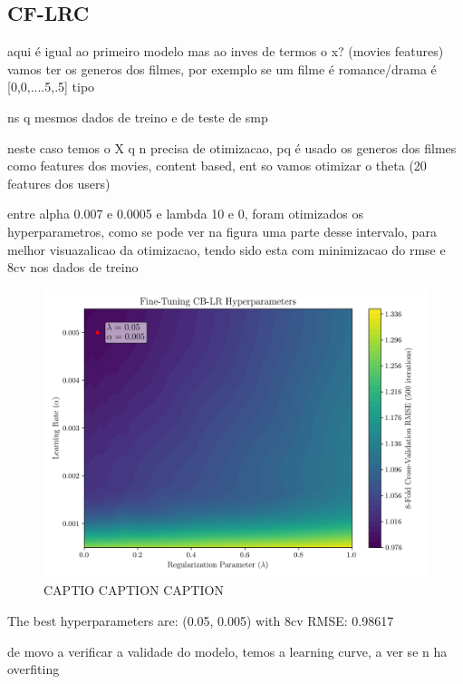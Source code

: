 \documentclass[conference]{IEEEtran}
\begin{document}
\subsection{CF-LRC}

aqui é igual ao primeiro modelo mas ao inves de termos o x? (movies features) vamos ter os generos dos filmes, por exemplo se um filme é romance/drama é [0,0,....5,.5] tipo

ns q mesmos dados de treino e de teste de smp

neste caso temos o X q n precisa de otimizacao, pq é usado os generos dos filmes como features dos movies, content based, ent so vamos otimizar o theta (20 features dos users)

entre alpha 0.007 e 0.0005 e lambda 10 e 0, foram otimizados os hyperparametros, como se pode ver na figura uma parte desse intervalo, para melhor visuazalicao da otimizacao, tendo sido esta com minimizacao do rmse e 8cv nos dados de treino

\begin{figure}[H]
    \centering
    \includegraphics[width=1\linewidth]{assets/model02_hyperparemeterstunning.png}
    \caption{CAPTIO CAPTION CAPTION}
    \label{fig:model02_hyperparemeterstunning}
\end{figure}

The best hyperparameters are: (0.05, 0.005) with 8cv RMSE: 0.98617


de movo a verificar a validade do modelo, temos a learning curve, a ver se n ha overfiting
\end{document}
